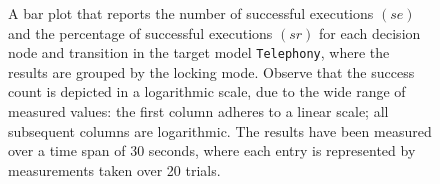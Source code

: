 \begin{figure}[h!]
\centering
\begin{minipage}{1\textwidth}
  \centering
  \makebox[\textwidth][c]{ %
        \resizebox{1.19\textwidth}{!}{ %
            
        }%
    }%
\end{minipage}
\caption{A bar plot that reports the number of successful executions $(se)$ and the percentage of successful executions $(sr)$ for each decision node and transition in the target model \texttt{Telephony}, where the results are grouped by the locking mode. Observe that the success count is depicted in a logarithmic scale, due to the wide range of measured values: the first column adheres to a linear scale; all subsequent columns are logarithmic. The results have been measured over a time span of 30 seconds, where each entry is represented by measurements taken over 20 trials.}
\label{figure:locking_mode_transition_frequency_comparison_telephony_random_det_user_3}
\end{figure}